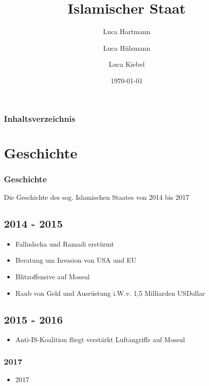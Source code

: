 \documentclass{beamer}
\begin{document}
\title{Islamischer Staat}
\author{Luca Hartmann \and Luca Hülsmann \and Luca Kiebel}
\date{\today}

\begin{frame}
\titlepage
\end{frame}

\begin{frame}
\frametitle{Inhaltsverzeichnis}\tableofcontents
\end{frame}

\section{Geschichte}
\begin{frame}
\frametitle{Geschichte}
Die Geschichte des sog. Islamischen Staates von 2014 bis 2017
\end{frame}

\subsection{2014 - 2015}
\begin{frame}
\begin{itemize}
	\item Falludscha und Ramadi erstürmt
	\item Beratung um Invasion von USA und EU
	\item Blitzoffensive auf Mossul
	\item Raub von Geld und Ausrüstung i.W.v. 1,5 Milliarden USDollar
\end{itemize}
\end{frame}
\subsection{2015 - 2016}
\begin{frame}
\begin{itemize}
	\item Anti-IS-Koalition fliegt verstärkt Luftangriffe auf Mossul

\end{itemize}
\end{frame}
\subsubsection{2017}
\begin{frame}
\begin{itemize}
	\item{2017}
\end{itemize}
\end{frame}
\end{document}
